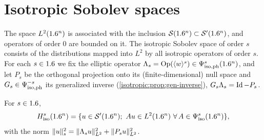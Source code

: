 \section{Isotropic Sobolev spaces}\label{isotropic:sec:sobolev}

The space $L^2(1.6^n)$ is associated with the inclusion
$\mathcal{S}(1.6^n)\subset\mathcal{S}'(1.6^n)$, and operators of order $0$ are bounded on it. The
isotropic Sobolev space of order $s$ consists of the distributions mapped into
$L^2$ by all isotropic operators of order $s$. For each $s\in1.6$ we fix the
elliptic operator $\Lambda_s=\operatorname{Op}(\langle w\rangle^s)\in\Psi^{s}_{\mathrm{iso,ph}}(1.6^n)$, and let
$P_s$ be the orthogonal projection onto its (finite-dimensional) null space
and $G_s\in\Psi^{-s}_{\mathrm{iso,ph}}$ its generalized inverse
(\cref{isotropic:prop:gen-inverse}), $G_s\Lambda_s=\operatorname{Id}-P_s$.

\begin{definition}\label{isotropic:def:Hiso}
For $s\in1.6$,
\begin{equation*}
  H^{s}_{\mathrm{iso}}(1.6^n)=\{u\in\mathcal{S}'(1.6^n);\ Au\in L^2(1.6^n)\ \forall\,A\in\Psi^{s}_{\mathrm{iso}}(1.6^n)\},
\end{equation*}
with the norm $\lVert u\rVert_{s}^2=\lVert \Lambda_su\rVert_{L^2}^2+\lVert P_su\rVert_{L^2}^2$.
\end{definition}

